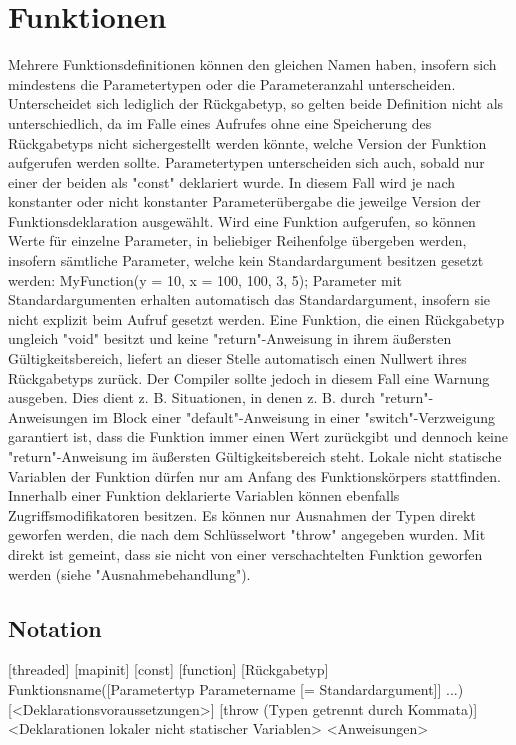 \chapter{Funktionen}

Mehrere Funktionsdefinitionen können den gleichen Namen haben, insofern sich mindestens die Parametertypen oder die Parameteranzahl unterscheiden.
Unterscheidet sich lediglich der Rückgabetyp, so gelten beide Definition nicht als unterschiedlich, da im Falle eines Aufrufes ohne eine Speicherung
des Rückgabetyps nicht sichergestellt werden könnte, welche Version der Funktion aufgerufen werden sollte.
Parametertypen unterscheiden sich auch, sobald nur einer der beiden als "const" deklariert wurde. In diesem Fall wird je nach konstanter oder nicht
konstanter Parameterübergabe die jeweilge Version der Funktionsdeklaration ausgewählt.
Wird eine Funktion aufgerufen, so können Werte für einzelne Parameter, in beliebiger Reihenfolge übergeben werden, insofern sämtliche
Parameter, welche kein Standardargument besitzen gesetzt werden:
MyFunction(y = 10, x = 100, 100, 3, 5);
Parameter mit Standardargumenten erhalten automatisch das Standardargument, insofern sie nicht explizit beim Aufruf gesetzt werden.
Eine Funktion, die einen Rückgabetyp ungleich "void" besitzt und keine "return"-Anweisung in ihrem äußersten Gültigkeitsbereich, liefert an dieser Stelle
automatisch einen Nullwert ihres Rückgabetyps zurück. Der Compiler sollte jedoch in diesem Fall eine Warnung ausgeben.
Dies dient z. B. Situationen, in denen z. B. durch "return"-Anweisungen im Block einer "default"-Anweisung in einer "switch"-Verzweigung
garantiert ist, dass die Funktion immer einen Wert zurückgibt und dennoch keine "return"-Anweisung im äußersten Gültigkeitsbereich steht.
Lokale nicht statische Variablen der Funktion dürfen nur am Anfang des Funktionskörpers stattfinden. Innerhalb einer Funktion deklarierte
Variablen können ebenfalls Zugriffsmodifikatoren besitzen.
Es können nur Ausnahmen der Typen direkt geworfen werden, die nach dem Schlüsselwort "throw" angegeben wurden.
Mit direkt ist gemeint, dass sie nicht von einer verschachtelten Funktion geworfen werden (siehe "Ausnahmebehandlung").

\section{Notation}
[threaded] [mapinit] [const] [function] [Rückgabetyp] Funktionsname([Parametertyp Parametername [= Standardargument]] ...) [<Deklarationsvoraussetzungen>] [throw (Typen getrennt durch Kommata)]
{
	<Deklarationen lokaler nicht statischer Variablen>
	<Anweisungen>
}

